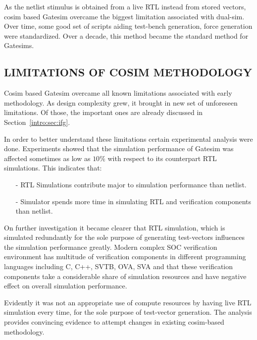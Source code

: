 As the netlist stimulus is obtained from a live RTL instead from stored vectors, cosim based Gatesim overcame the biggest limitation associated with dual-sim. Over time, some good set of scripts aiding test-bench generation, force generation were standardized. Over a decade, this method became the standard method for Gatesims.

\subsection {LIMITATIONS OF COSIM METHODOLOGY}

Cosim based Gatesim overcame all known limitations associated with early methodology. As design complexity grew, it brought in new set of unforeseen limitations. Of those, the important ones are already discussed in Section~\ref{intro:sec:ifg}.

In order to better understand these limitations certain experimental analysis were done. Experiments showed that the simulation performance of Gatesim was affected sometimes as low as $10\%$ with respect to its counterpart RTL simulations. This indicates that:

\begin{itemize}
	\item[-]RTL Simulations contribute major to simulation performance than netlist.
	\item[-]Simulator spends more time in simulating RTL and verification components than netlist.
\end{itemize}

On further investigation it became clearer that RTL simulation, which is simulated redundantly for the sole purpose of generating test-vectors influences the simulation performance greatly. Modern complex SOC verification environment has multitude of verification components in different programming languages including C, C++, SVTB, OVA, SVA and that these verification components take a considerable share of simulation resources and have negative effect on overall simulation performance.

Evidently it was not an appropriate use of compute resources by having live RTL simulation every time, for the sole purpose of test-vector generation. The analysis provides convincing evidence to attempt changes in existing cosim-based methodology.

